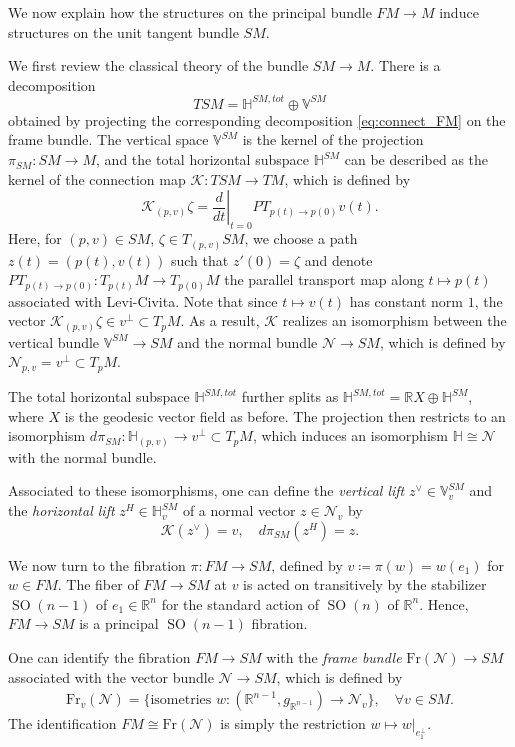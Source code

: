 \documentclass[12pt]{amsart}
\numberwithin{numbering}{section}
\theoremstyle{plain}
\theoremstyle{definition}
\theoremstyle{remark}
\numberwithin{equation}{section}
\DeclareMathOperator{\SO}{SO}
\newcommand{\psm}{\pi_{SM}}
\newcommand{\dpsm}{d\pi_{SM}}
\newcommand{\R}{\mathbb{R}}
\begin{document}
We now explain how the structures on the principal bundle $FM \to M$ induce structures on the unit tangent bundle $SM$. 

We first review the classical theory of the bundle $SM \to M$. There is a decomposition
\[ TSM = \mathbb{H}^{SM, tot} \oplus \mathbb{V}^{SM} \] 
obtained by projecting the corresponding decomposition \eqref{eq:connect_FM} on the frame bundle. The vertical space $\mathbb{V}^{SM}$ is the kernel of the projection $\psm : SM \to M$, and the total horizontal subspace $\mathbb{H}^{SM}$ can be described as the kernel of the connection map $\mathcal{K}: TSM \to TM$, which is defined by 
\[ \mathcal{K}_{(p, v)} \zeta = \left . \frac{d}{dt} \right \vert_{t=0} PT_{p(t) \to p(0)} v(t). \]
Here, for $(p, v) \in SM$, $\zeta \in T_{(p, v)} SM$, we choose a path $z(t) = (p(t), v(t))$ such that $z'(0) = \zeta$ and denote $PT_{p(t) \to p(0)} : T_{p(t)} M \to T_{p(0)} M$ the parallel transport map along $t \mapsto p(t)$ associated with Levi-Civita. Note that since $t \mapsto v(t)$ has constant norm $1$, the vector $\mathcal{K}_{(p, v)} \zeta \in v^\perp \subset T_p M$. As a result, $\mathcal{K}$ realizes an isomorphism between the vertical bundle $\mathbb{V}^{SM} \to SM$ and the normal bundle $\mathcal{N} \to SM$, which is defined by $\mathcal{N}_{p, v} = v^\perp \subset T_p M$. 

The total horizontal subspace $\mathbb{H}^{SM, tot}$ further splits as $\mathbb{H}^{SM, tot} = \R X \oplus \mathbb{H}^{SM}$, where $X$ is the geodesic vector field as before. The projection then restricts to an isomorphism $\dpsm: \mathbb{H}_{(p, v)} \to v^\perp \subset T_p M$, which induces an isomorphism $\mathbb{H} \cong \mathcal{N}$ with the normal bundle. 

Associated to these isomorphisms, one can define the \emph{vertical lift} $z^\vee \in \mathbb{V}^{SM}_v$ and the \emph{horizontal lift} $z^H \in \mathbb{H}^{SM}_v$ of a normal vector $z \in \mathcal{N}_v$ by 
\[ \mathcal{K}(z^\vee) = v, \quad \dpsm(z^H) = z. \]

\bigskip 

We now turn to the fibration $\pi: FM \to SM$, defined by $v \coloneq \pi(w) = w(e_1)$ for $w \in FM$. The fiber of $FM \to SM$ at $v$ is acted on transitively by the stabilizer $\SO(n-1)$ of $e_1 \in \R^n$ for the standard action of $\SO(n)$ of $\R^n$. Hence, $FM \to SM$ is a principal $\SO(n-1)$ fibration. 

One can identify the fibration $FM \to SM$ with the \emph{frame bundle} $\mathrm{Fr}(\mathcal{N}) \to SM$ associated with the vector bundle $\mathcal{N} \to SM$, which is defined by 
\begin{align}
\mathrm{Fr}_v(\mathcal{N}) = \{ \text{isometries } w: (\R^{n-1}, g_{\R^{n-1}}) \to \mathcal{N}_v\}, \quad \forall v \in SM.
\end{align}
The identification $FM \cong \mathrm{Fr}(\mathcal{N})$ is simply the restriction $w \mapsto w\vert_{e_1^\perp}$. 
\end{document}

